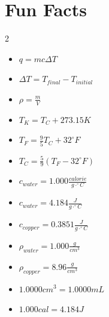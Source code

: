 \documentclass[11pt,addpoints]{exam}   	%
\begin{document}
\section*{Fun Facts}
\begin{multicols}{2}
\begin{itemize}
\item
$q = m c \Delta T$
\vspace{0.2in}

\item
$\Delta T = T_{final} - T_{initial}$
\vspace{0.2in}

\item
$\rho = \frac{m}{V} $
\vspace{0.2in}

\item
$T_K = T_C + 273.15 K$
\vspace{0.2in}

\item
$T_F = \frac{9}{5}T_C + 32^{\circ}F$
\vspace{0.2in}

\item
$T_C = \frac{5}{9}(T_F - 32^{\circ}F)$
\vspace{0.2in}

\item
$c_{water} = 1.000 \frac{calorie}{g \cdot ^{\circ}C}$
\vspace{0.2in}

\item
$c_{water} = 4.184 \frac{J}{g \cdot ^{\circ}C}$
\vspace{0.2in}

\item
$c_{copper} = 0.3851 \frac{J}{g \cdot ^{\circ}C}$
\vspace{0.2in}

\item
$\rho_{water} = 1.000 \frac{g}{cm^3}$
\vspace{0.2in}

\item
$\rho_{copper} = 8.96 \frac{g}{cm^3}$
\vspace{0.2in}

\item
$ 1.0000 cm^3 = 1.0000 mL $
\vspace{0.2in}

\item
$ 1.000 cal = 4.184 J $
\vspace{0.2in}


\end{itemize}
\end{multicols}
\end{document}
